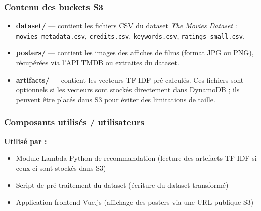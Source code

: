 \documentclass[a4paper,12pt]{report}
\begin{document}
\subsubsection{Contenu des buckets S3}

\begin{itemize}

\item \textbf{dataset/} — contient les fichiers CSV du dataset \textit{The Movies Dataset} :
\texttt{movies\_metadata.csv}, \texttt{credits.csv}, \texttt{keywords.csv}, \texttt{ratings\_small.csv}.

\item \textbf{posters/} — contient les images des affiches de films (format JPG ou PNG), récupérées via l'API TMDB ou extraites du dataset.

\item \textbf{artifacts/} — contient les vecteurs TF-IDF pré-calculés. Ces fichiers sont optionnels si les vecteurs sont stockés directement dans DynamoDB ; ils peuvent être placés dans S3 pour éviter des limitations de taille.

\end{itemize}

\subsubsection{Composants utilisés / utilisateurs}

\textbf{Utilisé par :}

\begin{itemize}

\item Module Lambda Python de recommandation (lecture des artefacts TF-IDF si ceux-ci sont stockés dans S3)

\item Script de pré-traitement du dataset (écriture du dataset transformé)

\item Application frontend Vue.js (affichage des posters via une URL publique S3)

\end{itemize}
\end{document}
